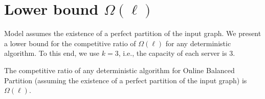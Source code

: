\section{Lower bound $\Omega(\ell)$}


Model assumes the existence of a perfect partition of the input graph.
We present a lower bound for the competitive ratio of $\Omega(\ell)$ for any deterministic algorithm.
To this end, we use $k = 3$, i.e., the capacity of each server is $3$.


\begin{theorem}
  The competitive ratio of any deterministic algorithm for Online Balanced Partition (assuming the existence of a perfect partition of the input graph) is $\Omega(\ell)$.
  \label{th:lb_omega_l}
\end{theorem}

